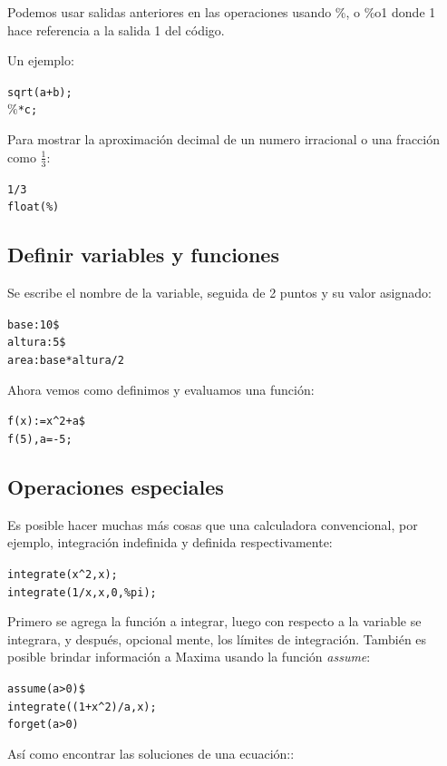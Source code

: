 \documentclass[a4paper]{article}
\begin{document}
Podemos usar salidas anteriores en las operaciones usando \%, o \%o1 donde 1 hace referencia a la salida 1 del código.

Un ejemplo:

\begin{alltt}
sqrt(a + b);
$\%$ * c;
\end{alltt}

Para mostrar la aproximación decimal de un numero irracional o una fracción como $\frac{1}{3}$:

\begin{alltt}
1 / 3
float(\%)
\end{alltt}


\subsection{Definir variables y funciones}
Se escribe el nombre de la variable, seguida de 2 puntos y su valor asignado:

\begin{alltt}
base: 10 \$
altura: 5 \$
area: base * altura / 2
\end{alltt}

Ahora vemos como definimos y evaluamos una función:

\begin{alltt}
f(x) := x^2 + a \$
f(5), a = -5;
\end{alltt}

\subsection{Operaciones especiales}

Es posible hacer muchas más cosas que una calculadora convencional, por ejemplo, integración indefinida y definida respectivamente:

\begin{alltt}
integrate( x^2, x);
integrate( 1/x, x, 0, \% pi);
\end{alltt}

Primero se agrega la función a integrar, luego con respecto a la variable se integrara, y después, opcional mente, los límites de integración. También es posible brindar información a Maxima usando la función \textit{assume}: 

\begin{alltt}
assume(a > 0)\$
integrate((1+x^2)/a,x);
forget(a > 0)
\end{alltt}

Así como encontrar las soluciones de una ecuación::
\end{document}

